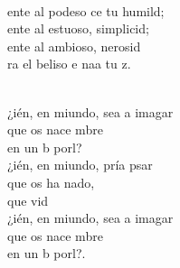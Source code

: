 \documentclass[12pt]{article}
\begin{document}
\begin{multicols*}{2}
\begin{cancion}
	\jump\\
	ente al podeso ce tu humild;\\
	ente al estuoso,  simplicid;\\
	ente al ambioso, nerosid\\
	ra el beliso e naa tu z.\\\jump\\
	\begin{chorus}%
	¿ién, en miundo, sea a imagar \\
	que os nace mbre\\
	en un b porl?  \\
	¿ién, en miundo, pría psar \\
	que os ha nado,\\
	que  vid \\
	¿ién, en miundo, sea a imagar \\
	que os nace mbre\\
	en un b porl?. \\
	\end{chorus}%
	\jump\\
\end{cancion}%


\end{multicols*}
\end{document}
